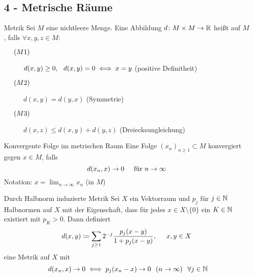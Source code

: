 \subsection*{4 - Metrische R{\"a}ume}

	\begin{karte}{Metrik}
		Sei $M$ eine nichtleere Menge. Eine Abbildung $d \colon M \times M \rightarrow 	\mathbb{R}$ hei{\ss}t  auf $M$, falls $\forall x, y, z \in M:$
			\begin{description}
				\item[$\hspace{0.5cm} (M1) \hspace{0.1cm} $] $d(x, y) \geq 0, \hspace{0.25cm} d(x, y) = 0 \iff x = y $  (positive Definitheit)
				\item[$\hspace{0.5cm} (M2) \hspace{0.1cm} $] $d(x, y) = d(y, x)$  (Symmetrie)
				\item[$\hspace{0.5cm} (M3) \hspace{0.1cm} $] $d(x, z) \leq d(x, y) + d(y, z)$  (Dreiecksungleichung)
			\end{description}
	\end{karte}
	
	\begin{karte}{Konvergente Folge im metrischen Raum}
		Eine Folge $(x_{n})_{n \geq 1} \subset M$ konvergiert gegen $x \in M$, falls
			\[ d(x_{n}, x) \rightarrow 0 \hspace{0.5cm} \text{für } n \rightarrow \infty \]	 
			Notation: $x = \lim_{n \rightarrow \infty} x_{n}$ (in $M$)
	\end{karte}
	
	\begin{karte}{Durch Halbnorm induzierte Metrik}
		Sei $X$ ein Vektorraum und $p_{j}$ für $j \in \mathbb{N}$ Halbnormen auf $X$ mit der Eigenschaft, dass für jedes $x \in X \setminus \{ 0 \}$ ein $K \in \mathbb{N}$ existiert mit $p_{K} > 0$. Dann definiert
			\[ d(x, y) \coloneqq \sum_{j \geq 1} 2^{-j} \frac{p_{j}(x - y)}{1 + p_{j}(x -y)}, \hspace{0.5cm} x, y \in X \]
			eine Metrik auf $X$ mit
			\[ d(x_{n}, x) \rightarrow 0 \gdw p_{j}(x_{n} - x) \rightarrow 0 \hspace{0.25cm} (n \rightarrow  \infty) \hspace{0.25cm} \forall j \in \MdN \]
	\end{karte}

